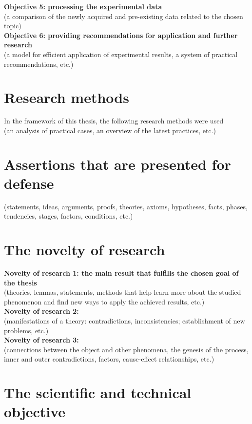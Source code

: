 \textbf{Objective 5: processing the experimental data }\\
(a comparison of the newly acquired and pre-existing data related to the chosen topic) \\

\textbf{Objective 6: providing recommendations for application and further research}\\
(a model for efficient application of experimental results, a system of practical recommendations, etc.)

\section*{Research methods}
In the framework of this thesis, the following research methods were used\\
(an analysis of practical cases, an overview of the latest practices, etc.)

\section*{Assertions that are presented for defense}
(statements, ideas, arguments, proofs, theories, axioms, hypotheses, facts, phases, tendencies, stages, factors, conditions, etc.)

\section*{The novelty of research}
\textbf{Novelty of research 1: the main result that fulfills the chosen goal of the thesis}\\
(theories, lemmas, statements, methods that help learn more about the studied phenomenon and find new ways to apply the achieved results, etc.)\\

\textbf{Novelty of research 2:}\\
(manifestations of a theory: contradictions, inconsistencies; establishment of new problems, etc.) \\

\textbf{Novelty of research 3:}\\
(connections between the object and other phenomena, the genesis of the process, inner and outer contradictions, factors, cause-effect relationships, etc.)

\section*{The scientific and technical objective}
